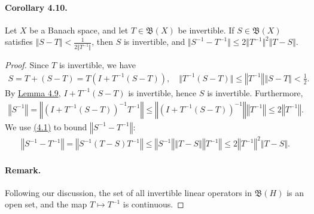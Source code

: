 \documentclass{article}
\begin{document}
\paragraph{Corollary 4.10.\label{cor:4.10}} Let $X$ be a Banach space, and let $T\in\mathfrak{B}(X)$ be invertible. If $S\in\mathfrak{B}(X)$ satisfies $\Vert S-T\Vert < \frac{1}{2\Vert T^{-1}\Vert}$, then $S$ is invertible, and $\Vert S^{-1}-T^{-1}\Vert\leq 2\Vert T^{-1}\Vert^2\Vert T-S\Vert$.
\begin{proof}
Since $T$ is invertible, we have
\begin{align*}
	S = T + (S-T) = T\left(I + T^{-1}(S-T)\right),\quad \Vert T^{-1}(S-T)\Vert \leq \left\Vert T^{-1}\right\Vert\left\Vert S-T\right\Vert < \frac{1}{2}.
\end{align*}
By \hyperref[lemma:4.9]{Lemma 4.9}, $I+T^{-1}(S-T)$ is invertible, hence $S$ is invertible. Furthermore,
\begin{align*}
	\left\Vert S^{-1}\right\Vert = \left\Vert\left(I + T^{-1}(S-T)\right)^{-1}T^{-1}\right\Vert\leq\left\Vert\left(I + T^{-1}(S-T)\right)^{-1}\right\Vert\left\Vert T^{-1}\right\Vert\leq 2\left\Vert T^{-1}\right\Vert.\label{eq:4.1}\tag{4.1}
\end{align*}
We use \hyperref[eq;4.1]{(4.1)} to bound $\left\Vert S^{-1}-T^{-1}\right\Vert$:
\begin{align*}
	\left\Vert S^{-1}-T^{-1}\right\Vert = \left\Vert S^{-1}(T-S)T^{-1}\right\Vert\leq\left\Vert S^{-1}\right\Vert\left\Vert T-S\right\Vert\left\Vert T^{-1}\right\Vert\leq 2\left\Vert T^{-1}\right\Vert^2\Vert T-S\Vert.\label{eq:4.2}\tag{4.2}
\end{align*}
\paragraph{Remark.} Following our discussion, the set of all invertible linear operators in $\mathfrak{B}(H)$ is an open set, and the map $T\mapsto T^{-1}$ is continuous.
\end{proof}
\end{document}
